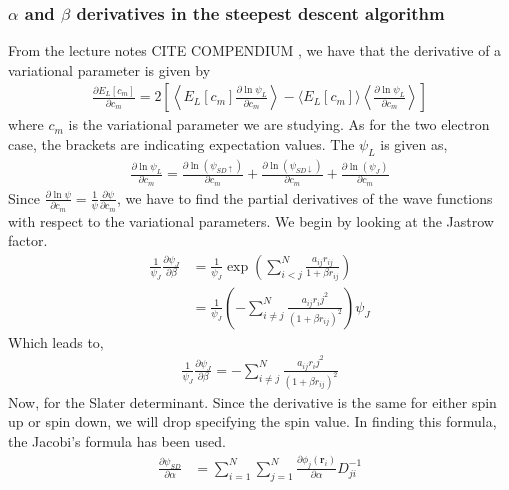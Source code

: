 \documentclass[11pt]{article}
\newcommand{\husk}[1]{\color{red} #1 \color{black}}
\begin{document}
\subsubsection{\texorpdfstring{$\alpha$}{a} and \texorpdfstring{$\beta$}{b} derivatives in the steepest descent algorithm}
From the lecture notes \husk{CITE COMPENDIUM}, we have that the derivative of a variational parameter is given by
\begin{align*}
	\frac{\partial E_L[c_m]}{\partial c_m} = 2 \left[ \left\langle E_L[c_m] \frac{\partial \ln \psi_L}{\partial c_m} \right\rangle - \langle E_L[c_m] \rangle \left\langle \frac{\partial \ln \psi_L}{\partial c_m} \right\rangle
	\right]
\end{align*}
where $c_m$ is the variational parameter we are studying. As for the two electron case, the brackets are indicating expectation values. The $\psi_L$ is given as,
\begin{align}
	\frac{\partial\ln \psi_L}{\partial c_m} = \frac{\partial\ln (\psi_{SD\uparrow})}{\partial c_m} + \frac{\partial\ln (\psi_{SD\downarrow})}{\partial c_m} + \frac{\partial\ln (\psi_{J})}{\partial c_m}
\end{align}
Since $\frac{\partial\ln\psi}{\partial c_m} = \frac{1}{\psi}\frac{\partial \psi}{\partial c_m}$, we have to find the partial derivatives of the wave functions with respect to the variational parameters. We begin by looking at the Jastrow factor.
\begin{align*}
	\frac{1}{\psi_J}\frac{\partial\psi_J}{\partial \beta} &= \frac{1}{\psi_J} \exp\left(\sum^N_{i<j}\frac{a_{ij}r_{ij}}{1+\beta r_{ij}}\right) \\
	&= \frac{1}{\psi_J}\left( - \sum_{i\neq j}^N \frac{a_{ij}r_ij^2}{(1+\beta r_{ij})^2} \right) \psi_J
\end{align*}
Which leads to,
\begin{align}
	\frac{1}{\psi_J}\frac{\partial\psi_J}{\partial \beta} = - \sum_{i\neq j}^N \frac{a_{ij}r_ij^2}{(1+\beta r_{ij})^2}
	\label{eq:jastrow-beta-derivative-n-particle}
\end{align}
Now, for the Slater determinant. Since the derivative is the same for either spin up or spin down, we will drop specifying the spin value. In finding this formula, the Jacobi's formula has been used.
\begin{align}
	\frac{\partial \psi_{SD}}{\partial\alpha} &= \sum^N_{i=1}\sum^N_{j=1} \frac{\partial\phi_j(\mathbf{r}_i)}{\partial \alpha} D^{-1}_{ji} \\
	\label{eq:slater-determinant-alpha-derivative}
\end{align}
\end{document}
